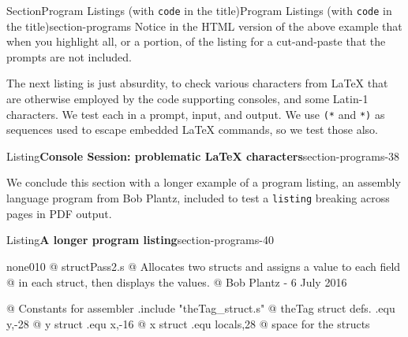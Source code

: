 \documentclass[twoside,10pt,]{article}
\newcommand{\mono}[1]{\texttt{#1}}
\numberwithin{equation}{section}
\newcommand{\consoleinput}[1]{\textbf{#1}}
\begin{document}
\begin{sectionptx}{Section}{Program Listings (with \mono{code} in the title)}{}{Program Listings (with \mono{code} in the title)}{}{}{section-programs}
Notice in the HTML version of the above example that when you highlight all, or a portion, of the listing for a cut-and-paste that the prompts are not included.%
\par
The next listing is just absurdity, to check various characters from \LaTeX{} that are otherwise employed by the code supporting consoles, and some Latin-1 characters.  We test each in a prompt, input, and output.  We use \mono{(*} and \mono{*)} as sequences used to escape embedded \LaTeX{} commands, so we test those also.%
\begin{listingptx}{Listing}{\textbf{Console Session: problematic \LaTeX{} characters}}{section-programs-38}{}%
\begin{console}{0}{1}{0}
A backslash \ here  (*\consoleinput{A backslash \textbackslash{} here}*)
A backslash \ here
A begin group { here  (*\consoleinput{A begin group \{ here}*)
A begin group { here
An end group { here  (*\consoleinput{An end group \} here}*)
An end group } here
An open escape sequence (*({}**) here  (*\consoleinput{An open escape sequence ({}*{} here}*)
An open escape sequence (*({}**) here
An end escape sequence (**{})*) here  (*\consoleinput{An end escape sequence *{}){} here}*)
An end escape sequence (**{})*) here
Some quotation marks ` ' " here  (*\consoleinput{Some quotation marks \textasciigrave{} \textquotesingle{} \textquotedbl{} here}*)
Some quotation marks ` ' " here
The rest & %
The rest & %
Latin-1: ÆÇÈÉÊËÌÍÎÏÐÑÒÓÔÕÖ×ØÙÚÛÜÝÞß  (*\consoleinput{Latin-1: ÆÇÈÉÊËÌÍÎÏÐÑÒÓÔÕÖ×ØÙÚÛÜÝÞß}*)
Latin-1: ÆÇÈÉÊËÌÍÎÏÐÑÒÓÔÕÖ×ØÙÚÛÜÝÞß
\end{console}
\end{listingptx}%
We conclude this section with a longer example of a program listing, an assembly language program from Bob Plantz, included to test a \mono{listing} breaking across pages in PDF output.%
\begin{listingptx}{Listing}{\textbf{A longer program listing}}{section-programs-40}{}%
\begin{program}{none}{0}{1}{0}
@ structPass2.s
@ Allocates two structs and assigns a value to each field
@ in each struct, then displays the values.
@ Bob Plantz - 6 July 2016

@ Constants for assembler
        .include "theTag_struct.s"  @ theTag struct defs.
        .equ    y,-28           @ y struct
        .equ    x,-16           @ x struct
        .equ    locals,28       @ space for the structs


\end{program}
\end{listingptx}
\end{sectionptx}
\end{document}
